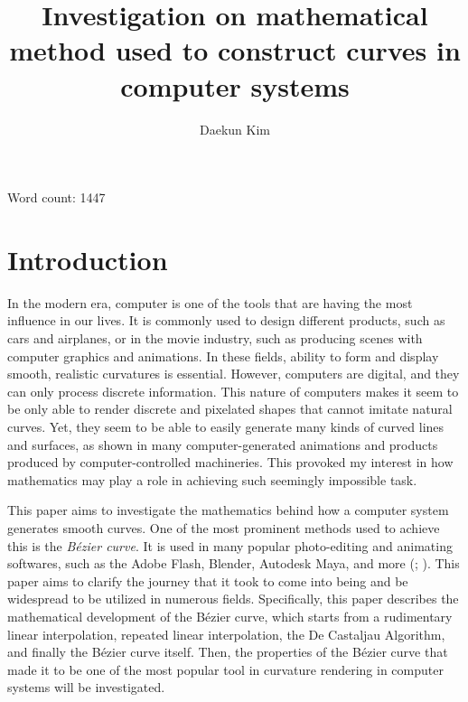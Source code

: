 \documentclass[11pt, oneside]{article}   	%
\title{Investigation on mathematical method used to construct curves in computer systems}
\author{Daekun Kim}
\theoremstyle{definition}
\numberwithin{figure}{section}
\begin{document}
\begin{titlingpage}
\maketitle
Word count: 1447
\end{titlingpage}
\tableofcontents
\newpage

\section{Introduction}
In the modern era, computer is one of the tools that are having the most influence in our lives. It is commonly used to design different products, such as cars and airplanes, or in the movie industry, such as producing scenes with computer graphics and animations. In these fields, ability to form and display smooth, realistic curvatures is essential. However, computers are digital, and they can only process discrete information. This nature of computers makes it seem to be only able to render discrete and pixelated shapes that cannot imitate natural curves. Yet, they seem to be able to easily generate many kinds of curved lines and surfaces, as shown in many computer-generated animations and products produced by computer-controlled machineries. This provoked my interest in how mathematics may play a role in achieving such seemingly impossible task.

This paper aims to investigate the mathematics behind how a computer system generates smooth curves. One of the most prominent methods used to achieve this is the \emph{B\'{e}zier curve}. It is used in many popular photo-editing and animating softwares, such as the Adobe Flash\textregistered, Blender\texttrademark, Autodesk Maya\textregistered, and more (; ). This paper aims to clarify the journey that it took to come into being and be widespread to be utilized in numerous fields. Specifically, this paper describes the mathematical development of the B\'{e}zier curve, which starts from a rudimentary linear interpolation, repeated linear interpolation, the De Castaljau Algorithm, and finally the B\'{e}zier curve itself. Then, the properties of the B\'{e}zier curve that made it to be one of the most popular tool in curvature rendering in computer systems will be investigated.
\end{document}
